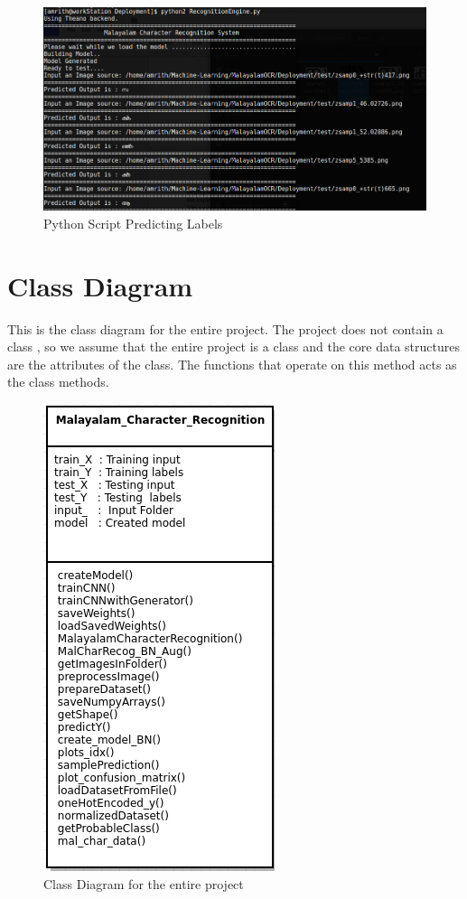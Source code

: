 \documentclass[12pt]{report}
\begin{document}
\begin{figure}[h]
    \centering
    \includegraphics[scale = .5]{deployment.png}
    \caption{Python Script Predicting Labels}
\end{figure}

\newpage
\section*{Class Diagram}
This is the class diagram for the entire project. The project does not contain a class , so we assume that the entire project is a class and the core data structures are the attributes of the class. The functions that operate on this method acts as the class methods.
\begin{figure}[h]
    \centering
    \includegraphics[scale = 1 ]{classdia.png}
    \caption{Class Diagram for the entire project}
\end{figure}
\end{document}
